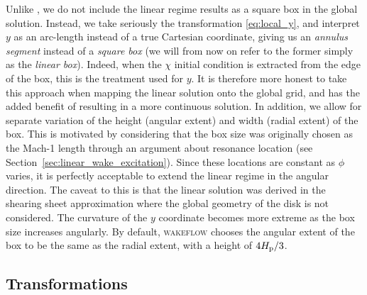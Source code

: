 Unlike \citet{bollati2021}, we do not include the linear regime results as a square box in the global solution.
Instead, we take seriously the transformation \eqref{eq:local_y}, and interpret $y$ as an arc-length instead of a true Cartesian coordinate, giving us an \textit{annulus segment} instead of a \textit{square box} (we will from now on refer to the former simply as the \textit{linear box}).
Indeed, when the $\chi$ initial condition is extracted from the edge of the box, this is the treatment used for $y$.
It is therefore more honest to take this approach when mapping the linear solution onto the global grid, and has the added benefit of resulting in a more continuous solution.
In addition, we allow for separate variation of the height (angular extent) and width (radial extent) of the box.
This is motivated by considering that the box size was originally chosen as the Mach-1 length through an argument about resonance location (see Section~\ref{sec:linear_wake_excitation}).
Since these locations are constant as $\phi$ varies, it is perfectly acceptable to extend the linear regime in the angular direction.
The caveat to this is that the linear solution was derived in the shearing sheet approximation where the global geometry of the disk is not considered.
The curvature of the $y$ coordinate becomes more extreme as the box size increases angularly.
By default, \textsc{wakeflow} chooses the angular extent of the box to be the same as the radial extent, with a height of $4H_{\rm p}/3$.

\subsection{Transformations} \label{sec:transformations}

